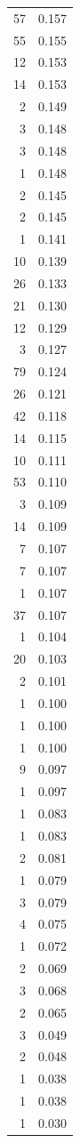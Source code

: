 \begin{tabular}{rr}
57 & 0.157 \\
55 & 0.155 \\
12 & 0.153 \\
14 & 0.153 \\
2 & 0.149 \\
3 & 0.148 \\
3 & 0.148 \\
1 & 0.148 \\
2 & 0.145 \\
2 & 0.145 \\
1 & 0.141 \\
10 & 0.139 \\
26 & 0.133 \\
21 & 0.130 \\
12 & 0.129 \\
3 & 0.127 \\
79 & 0.124 \\
26 & 0.121 \\
42 & 0.118 \\
14 & 0.115 \\
10 & 0.111 \\
53 & 0.110 \\
3 & 0.109 \\
14 & 0.109 \\
7 & 0.107 \\
7 & 0.107 \\
1 & 0.107 \\
37 & 0.107 \\
1 & 0.104 \\
20 & 0.103 \\
2 & 0.101 \\
1 & 0.100 \\
1 & 0.100 \\
1 & 0.100 \\
9 & 0.097 \\
1 & 0.097 \\
1 & 0.083 \\
1 & 0.083 \\
2 & 0.081 \\
1 & 0.079 \\
3 & 0.079 \\
4 & 0.075 \\
1 & 0.072 \\
2 & 0.069 \\
3 & 0.068 \\
2 & 0.065 \\
3 & 0.049 \\
2 & 0.048 \\
1 & 0.038 \\
1 & 0.038 \\
1 & 0.030 \\
\bottomrule
\end{tabular}
